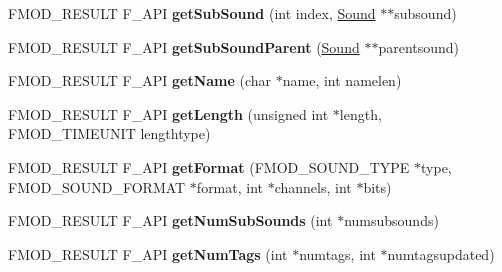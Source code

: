 \begin{DoxyCompactItemize}
\item 
\hypertarget{class_f_m_o_d_1_1_sound_ae1f9dd4b19f536a11850961348d6210f}{F\+M\+O\+D\+\_\+\+R\+E\+S\+U\+L\+T F\+\_\+\+A\+P\+I {\bfseries get\+Sub\+Sound} (int index, \hyperlink{class_f_m_o_d_1_1_sound}{Sound} $\ast$$\ast$subsound)}\label{class_f_m_o_d_1_1_sound_ae1f9dd4b19f536a11850961348d6210f}

\item 
\hypertarget{class_f_m_o_d_1_1_sound_a0634bd4977fc537bd7a497aaf380009a}{F\+M\+O\+D\+\_\+\+R\+E\+S\+U\+L\+T F\+\_\+\+A\+P\+I {\bfseries get\+Sub\+Sound\+Parent} (\hyperlink{class_f_m_o_d_1_1_sound}{Sound} $\ast$$\ast$parentsound)}\label{class_f_m_o_d_1_1_sound_a0634bd4977fc537bd7a497aaf380009a}

\item 
\hypertarget{class_f_m_o_d_1_1_sound_a448ce4d402d03d76c79f289565cae2c2}{F\+M\+O\+D\+\_\+\+R\+E\+S\+U\+L\+T F\+\_\+\+A\+P\+I {\bfseries get\+Name} (char $\ast$name, int namelen)}\label{class_f_m_o_d_1_1_sound_a448ce4d402d03d76c79f289565cae2c2}

\item 
\hypertarget{class_f_m_o_d_1_1_sound_a3f0b77ce74332b1f358816eedfc6ca02}{F\+M\+O\+D\+\_\+\+R\+E\+S\+U\+L\+T F\+\_\+\+A\+P\+I {\bfseries get\+Length} (unsigned int $\ast$length, F\+M\+O\+D\+\_\+\+T\+I\+M\+E\+U\+N\+I\+T lengthtype)}\label{class_f_m_o_d_1_1_sound_a3f0b77ce74332b1f358816eedfc6ca02}

\item 
\hypertarget{class_f_m_o_d_1_1_sound_a3b74a166eab897c4b01795aac95eceb1}{F\+M\+O\+D\+\_\+\+R\+E\+S\+U\+L\+T F\+\_\+\+A\+P\+I {\bfseries get\+Format} (F\+M\+O\+D\+\_\+\+S\+O\+U\+N\+D\+\_\+\+T\+Y\+P\+E $\ast$type, F\+M\+O\+D\+\_\+\+S\+O\+U\+N\+D\+\_\+\+F\+O\+R\+M\+A\+T $\ast$format, int $\ast$channels, int $\ast$bits)}\label{class_f_m_o_d_1_1_sound_a3b74a166eab897c4b01795aac95eceb1}

\item 
\hypertarget{class_f_m_o_d_1_1_sound_ade84503ee47f6c08a1116899c4b59ab7}{F\+M\+O\+D\+\_\+\+R\+E\+S\+U\+L\+T F\+\_\+\+A\+P\+I {\bfseries get\+Num\+Sub\+Sounds} (int $\ast$numsubsounds)}\label{class_f_m_o_d_1_1_sound_ade84503ee47f6c08a1116899c4b59ab7}

\item 
\hypertarget{class_f_m_o_d_1_1_sound_af676bc0be9a87128c8b09f104a4ce31c}{F\+M\+O\+D\+\_\+\+R\+E\+S\+U\+L\+T F\+\_\+\+A\+P\+I {\bfseries get\+Num\+Tags} (int $\ast$numtags, int $\ast$numtagsupdated)}\label{class_f_m_o_d_1_1_sound_af676bc0be9a87128c8b09f104a4ce31c}


\end{DoxyCompactItemize}
